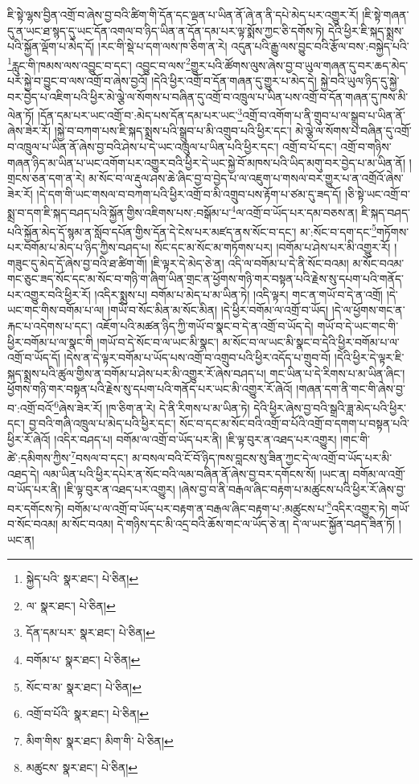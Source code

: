 ཇི་སྟེ་ལྷས་བྱིན་འགྲོ་བ་ཞེས་བྱ་བའི་ཚིག་གི་དོན་དང་ལྡན་པ་ཡིན་ནོ་ཞེ་ན་ནི་དཔེ་མེད་པར་འགྱུར་རོ། །ཇི་སྟེ་གཞན་དུ་ན་ཡང་ཐ་སྙད་དུ་ཡང་དོན་འགལ་བ་ཉིད་ཡིན་ན་དོན་དམ་པར་ལྟ་སྨོས་ཀྱང་ཅི་དགོས་ཏེ། དེའི་ཕྱིར་ཇི་སྐད་སྨྲས་པའི་སྐྱོན་ལྡོག་པ་མེད་དོ། །རང་གི་སྡེ་པ་དག་ལས་ཁ་ཅིག་ན་རེ། འདུན་པའི་རྒྱུ་ལས་བྱུང་བའི་རྩོལ་བས་:བསྐྱེད་པའི་\footnote{སྐྱེད་པའི་  སྣར་ཐང་།  པེ་ཅིན། }རླུང་གི་ཁམས་ལས་འབྱུང་བ་དང་། འབྱུང་བ་ལས་\footnote{ལ་  སྣར་ཐང་།  པེ་ཅིན། }གྱུར་པའི་ཚོགས་ལུས་ཞེས་བྱ་བ་ཡུལ་གཞན་དུ་བར་ཆད་མེད་པར་སྐྱེ་བ་བྱུང་བ་ལས་འགྲོ་བ་ཞེས་བྱའོ། །དེའི་ཕྱིར་འགྲོ་བ་དོན་གཞན་དུ་གྱུར་པ་མེད་དེ། སྐྱེ་བའི་ཡུལ་ཉིད་དུ་སྐྱེ་བར་བྱེད་པ་འཇིག་པའི་ཕྱིར་མེ་ལྕེ་ལ་སོགས་པ་བཞིན་དུ་འགྲོ་བ་འཁྲུལ་པ་ཡིན་པས་འགྲོ་བ་དོན་གཞན་དུ་ཁས་མི་ལེན་ཏོ། །དོན་དམ་པར་ཡང་འགྲོ་བ་:མེད་པས་དོན་དམ་པར་ཡང་\footnote{དོན་དམ་པར་  སྣར་ཐང་།  པེ་ཅིན། }འགྲོ་བ་འགོག་པ་ནི་གྲུབ་པ་ལ་སྒྲུབ་པ་ཡིན་ནོ་ཞེས་ཟེར་རོ། །སྐྱེ་བ་བཀག་པས་ཇི་སྐད་སྨྲས་པའི་སྒྲུབ་པ་མི་འགྲུབ་པའི་ཕྱིར་དང་། མེ་ལྕེ་ལ་སོགས་པ་བཞིན་དུ་འགྲོ་བ་འཁྲུལ་པ་ཡིན་ནོ་ཞེས་བྱ་བའི་ཤེས་པ་དེ་ཡང་འཁྲུལ་པ་ཡིན་པའི་ཕྱིར་དང་། འགྲོ་བ་པོ་དང་། འགྲོ་བ་གཉིས་གཞན་ཉིད་མ་ཡིན་པ་ཡང་འགོག་པར་འགྱུར་བའི་ཕྱིར་དེ་ཡང་སྐྱེ་བོ་མཁས་པའི་ཡིད་མགུ་བར་བྱེད་པ་མ་ཡིན་ནོ། །གྲངས་ཅན་དག་ན་རེ། མ་སོང་བ་ལ་རྡུལ་ཤས་ཆེ་ཞིང་བྱ་བ་བྱེད་པ་ལ་འཇུག་པ་གསལ་བར་གྱུར་པ་ན་འགྲོའོ་ཞེས་ཟེར་རོ། །དེ་དག་གི་ཡང་གསལ་བ་བཀག་པའི་ཕྱིར་འགྲོ་བ་མི་འགྲུབ་པས་རྟོག་པ་ཙམ་དུ་ཟད་དོ། །ཅི་སྟེ་ཡང་འགྲོ་བ་སྨྲ་བ་དག་ཇི་སྐད་བཤད་པའི་སྐྱོན་གྱིས་འཇིགས་པས་:བསྒོམ་པ་\footnote{བགོམ་པ་  སྣར་ཐང་།  པེ་ཅིན། }ལ་འགྲོ་བ་ཡོད་པར་དམ་བཅས་ན། ཇི་སྐད་བཤད་པའི་སྐྱོན་མེད་དོ་སྙམ་ན་སློབ་དཔོན་གྱིས་དོན་དེ་ངེས་པར་མཛད་ནས་སོང་བ་དང་། མ་:སོང་བ་དག་དང་\footnote{སོང་བ་མ་  སྣར་ཐང་།  པེ་ཅིན། }གཏོགས་པར་བགོམ་པ་མེད་པ་ཉིད་ཀྱིས་བཤད་པ། སོང་དང་མ་སོང་མ་གཏོགས་པར། །བགོམ་པ་ཤེས་པར་མི་འགྱུར་རོ། །གཟུང་དུ་མེད་དོ་ཞེས་བྱ་བའི་ཐ་ཚིག་གོ། །ཇི་ལྟར་དེ་མེད་ཅེ་ན། འདི་ལ་བགོམ་པ་དེ་ནི་སོང་བའམ། མ་སོང་བའམ་གང་ཅུང་ཟད་སོང་དང་མ་སོང་བ་གཉི་ག་ཞིག་ཡིན་གྲང་ན་ཕྱོགས་གཉི་གར་བསྟན་པའི་རྗེས་སུ་དཔག་པའི་གནོད་པར་འགྱུར་བའི་ཕྱིར་རོ། །འདིར་སྨྲས་པ། བགོམ་པ་མེད་པ་མ་ཡིན་ཏེ། །འདི་ལྟར། གང་ན་གཡོ་བ་དེ་ན་འགྲོ། །དེ་ཡང་གང་གིས་བགོམ་པ་ལ། །གཡོ་བ་སོང་མིན་མ་སོང་མིན། །དེ་ཕྱིར་བགོམ་ལ་འགྲོ་བ་ཡོད། །དེ་ལ་ཕྱོགས་གང་ན་རྐང་པ་འདེགས་པ་དང་། འཇོག་པའི་མཚན་ཉིད་ཀྱི་གཡོ་བ་སྣང་བ་དེ་ན་འགྲོ་བ་ཡོད་དེ། གཡོ་བ་དེ་ཡང་གང་གི་ཕྱིར་བགོམ་པ་ལ་སྣང་གི །གཡོ་བ་དེ་སོང་བ་ལ་ཡང་མི་སྣང་། མ་སོང་བ་ལ་ཡང་མི་སྣང་བ་དེའི་ཕྱིར་བགོམ་པ་ལ་འགྲོ་བ་ཡོད་དོ། །དེས་ན་དེ་ལྟར་བགོམ་པ་ཡོད་པས་འགྲོ་བ་འགྲུབ་པའི་ཕྱིར་འདོད་པ་གྲུབ་བོ། །དེའི་ཕྱིར་དེ་ལྟར་ཇི་སྐད་སྨྲས་པའི་ཚུལ་གྱིས་ན་བགོམ་པ་ཤེས་པར་མི་འགྱུར་རོ་ཞེས་བཤད་པ། གང་ཡིན་པ་དེ་རིགས་པ་མ་ཡིན་ཞིང་། ཕྱོགས་གཉི་གར་བསྟན་པའི་རྗེས་སུ་དཔག་པའི་གནོད་པར་ཡང་མི་འགྱུར་རོ་ཞེའོ། །གཞན་དག་ནི་གང་གི་ཞེས་བྱ་བ་:འགྲོ་བའོ་\footnote{འགྲོ་བ་པོའི་  སྣར་ཐང་།  པེ་ཅིན། }ཞེས་ཟེར་རོ། །ཁ་ཅིག་ན་རེ། དེ་ནི་རིགས་པ་མ་ཡིན་ཏེ། དེའི་ཕྱིར་ཞེས་བྱ་བའི་སྒྲའི་ཟླ་མེད་པའི་ཕྱིར་དང་། བྱ་བའི་གཞི་འཁྲུལ་པ་མེད་པའི་ཕྱིར་དང་། སོང་བ་དང་མ་སོང་བའི་འགྲོ་བ་པོའི་འགྲོ་བ་དགག་པ་བསྟན་པའི་ཕྱིར་རོ་ཞེའོ། །འདིར་བཤད་པ། བགོམ་ལ་འགྲོ་བ་ཡོད་པར་ནི། །ཇི་ལྟ་བུར་ན་འཐད་པར་འགྱུར། །གང་གི་ཚེ་:དམིགས་ཀྱིས་\footnote{མིག་གིས་  སྣར་ཐང་། མིག་གི་  པེ་ཅིན། }བསལ་བ་དང་། མ་བསལ་བའི་ངོ་བོ་ཉིད་ཁས་བླངས་སུ་ཟིན་ཀྱང་དེ་ལ་འགྲོ་བ་ཡོད་པར་མི་འཐད་དེ། ལམ་ཡིན་པའི་ཕྱིར་དཔེར་ན་སོང་བའི་ལམ་བཞིན་ནོ་ཞེས་བྱ་བར་དགོངས་སོ། །ཡང་ན། བགོམ་ལ་འགྲོ་བ་ཡོད་པར་ནི། །ཇི་ལྟ་བུར་ན་འཐད་པར་འགྱུར། །ཞེས་བྱ་བ་ནི་བརྒལ་ཞིང་བརྟག་པ་མཚུངས་པའི་ཕྱིར་རོ་ཞེས་བྱ་བར་དགོངས་ཏེ། བགོམ་པ་ལ་འགྲོ་བ་ཡོད་པར་བརྟག་ན་བརྒལ་ཞིང་བརྟག་པ་:མཚུངས་པ་\footnote{མཚུངས་  སྣར་ཐང་།  པེ་ཅིན། }འདིར་འགྱུར་ཏེ། གཡོ་བ་སོང་བའམ། མ་སོང་བའམ། དེ་གཉིས་དང་མི་འདྲ་བའི་ཆོས་གང་ལ་ཡོད་ཅེ་ན། དེ་ལ་ཡང་སྐྱོན་བཤད་ཟིན་ཏོ། །ཡང་ན། 